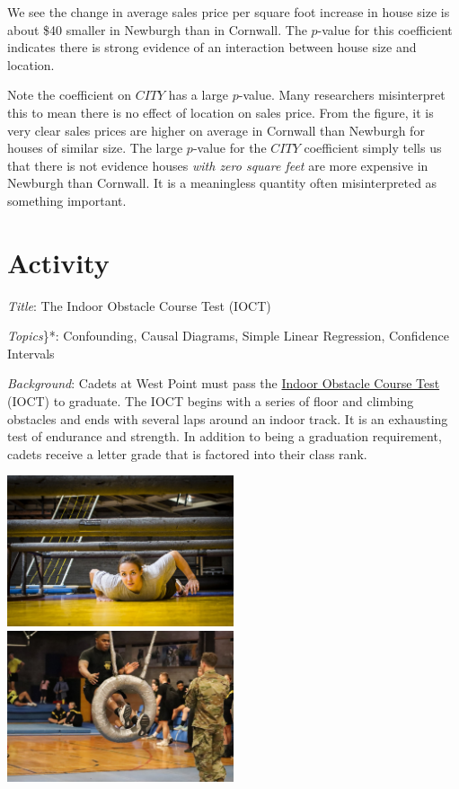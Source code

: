 \documentclass[
]{book}
\begin{document}
We see the change in average sales price per square foot increase in house size is about \$40 smaller in Newburgh than in Cornwall. The \(p\)-value for this coefficient indicates there is strong evidence of an interaction between house size and location.

Note the coefficient on \(CITY\) has a large \(p\)-value. Many researchers misinterpret this to mean there is no effect of location on sales price. From the figure, it is very clear sales prices are higher on average in Cornwall than Newburgh for houses of similar size. The large \(p\)-value for the \(CITY\) coefficient simply tells us that there is not evidence houses \emph{with zero square feet} are more expensive in Newburgh than Cornwall. It is a meaningless quantity often misinterpreted as something important.

\hypertarget{activity}{%
\chapter{Activity}\label{activity}}

\emph{Title}: The Indoor Obstacle Course Test (IOCT)

\emph{Topics}\}*: Confounding, Causal Diagrams, Simple Linear Regression, Confidence Intervals

\emph{Background}: Cadets at West Point must pass the \href{https://www.youtube.com/watch?v=94tPO0fGtJo\&t=77s}{Indoor Obstacle Course Test} (IOCT) to graduate. The IOCT begins with a series of floor and climbing obstacles and ends with several laps around an indoor track. It is an exhausting test of endurance and strength. In addition to being a graduation requirement, cadets receive a letter grade that is factored into their class rank.

\includegraphics[width=0.5\textwidth,height=\textheight]{./images/crawlObstacle.jpg} \includegraphics[width=0.5\textwidth,height=\textheight]{./images/tireObstacle.jpg}
\end{document}
